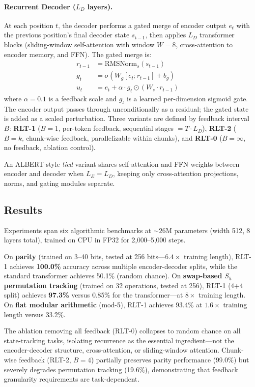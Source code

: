 \documentclass[11pt,a4paper]{article}
\begin{document}
\paragraph{Recurrent Decoder ($L_D$ layers).} At each position $t$, the decoder performs a gated merge of encoder output $e_t$ with the previous position's final decoder state $s_{t-1}$, then applies $L_D$ transformer blocks (sliding-window self-attention with window $W{=}8$, cross-attention to encoder memory, and FFN). The gated merge is:
\begin{align}
r_{t-1} &= \text{RMSNorm}_s(s_{t-1}) \\
g_t &= \sigma(W_g[e_t; r_{t-1}] + b_g) \\
u_t &= e_t + \alpha \cdot g_t \odot (W_s \cdot r_{t-1})
\end{align}
where $\alpha{=}0.1$ is a feedback scale and $g_t$ is a learned per-dimension sigmoid gate. The encoder output passes through unconditionally as a residual; the gated state is added as a scaled perturbation. Three variants are defined by feedback interval $B$: \textbf{RLT-1} ($B{=}1$, per-token feedback, sequential stages $= T \cdot L_D$), \textbf{RLT-2} ($B{=}k$, chunk-wise feedback, parallelizable within chunks), and \textbf{RLT-0} ($B{=}\infty$, no feedback, ablation control).

An ALBERT-style \emph{tied} variant shares self-attention and FFN weights between encoder and decoder when $L_E = L_D$, keeping only cross-attention projections, norms, and gating modules separate.

\subsection{Results}
Experiments span six algorithmic benchmarks at ${\sim}26$M parameters (width 512, 8 layers total), trained on CPU in FP32 for 2,000--5,000 steps.

On \textbf{parity} (trained on 3--40 bits, tested at 256 bits---$6.4\times$ training length), RLT-1 achieves \textbf{100.0\%} accuracy across multiple encoder-decoder splits, while the standard transformer achieves 50.1\% (random chance). On \textbf{swap-based $S_5$ permutation tracking} (trained on 32 operations, tested at 256), RLT-1 (4+4 split) achieves \textbf{97.3\%} versus 0.85\% for the transformer---at $8\times$ training length. On \textbf{flat modular arithmetic} (mod-5), RLT-1 achieves 93.4\% at $1.6\times$ training length versus 33.2\%.

The ablation removing all feedback (RLT-0) collapses to random chance on all state-tracking tasks, isolating recurrence as the essential ingredient---not the encoder-decoder structure, cross-attention, or sliding-window attention. Chunk-wise feedback (RLT-2, $B{=}4$) partially preserves parity performance (99.0\%) but severely degrades permutation tracking (19.6\%), demonstrating that feedback granularity requirements are task-dependent.
\end{document}
